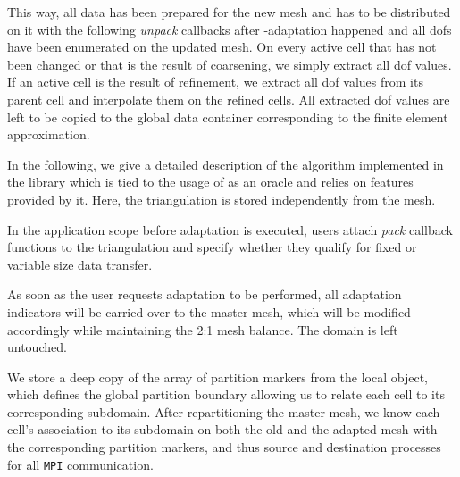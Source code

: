 This way, all data has been prepared for the new mesh and has to be distributed on it with the following \textit{unpack} callbacks after \hp-adaptation happened and all \glspl{dof} have been enumerated on the updated mesh. On every active cell that has not been changed or that is the result of coarsening, we simply extract all \gls{dof} values. If an active cell is the result of refinement, we extract all \gls{dof} values from its parent cell and interpolate them on the refined cells. All extracted \gls{dof} values are left to be copied to the global data container corresponding to the finite element approximation.

In the following, we give a detailed description of the algorithm implemented in the \dealii{} library which is tied to the usage of \pforest{} \textcite{p4est22} as an oracle and relies on features provided by it. Here, the \dealii{} triangulation is stored independently from the \pforest{} mesh.

In the application scope before adaptation is executed, users attach \textit{pack} callback functions to the triangulation and specify whether they qualify for fixed or variable size data transfer.

As soon as the user requests adaptation to be performed, all adaptation indicators will be carried over to the \pforest{} master mesh, which will be modified accordingly while maintaining the 2:1 mesh balance. The \dealii{} domain is left untouched.

We store a deep copy of the array of partition markers \parencite{burstedde2018} from the local \pforest{} object, which defines the global partition boundary allowing us to relate each cell to its corresponding subdomain. After repartitioning the \pforest{} master mesh, we know each cell's association to its subdomain on both the old and the adapted mesh with the corresponding partition markers, and thus source and destination processes for all \texttt{MPI} communication.



